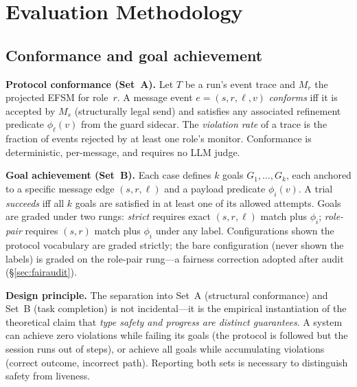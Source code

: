 % 
%

\section{Evaluation Methodology}\label{sec:method}

\subsection{Conformance and goal achievement}\label{sec:conform}

\textbf{Protocol conformance (Set~A).}
Let $T$ be a run's event trace and $M_r$ the projected EFSM for role~$r$.
A message event $e = (s, r, \ell, v)$ \emph{conforms} iff it is accepted by
$M_s$ (structurally legal send) and satisfies any associated refinement
predicate $\phi_\ell(v)$ from the guard sidecar.
The \emph{violation rate} of a trace is the fraction of events rejected by
at least one role's monitor.
Conformance is deterministic, per-message, and requires no LLM judge.

\textbf{Goal achievement (Set~B).}
Each case defines $k$ goals $G_1, \ldots, G_k$, each anchored to a specific
message edge $(s, r, \ell)$ and a payload predicate $\phi_i(v)$.
A trial \emph{succeeds} iff all $k$ goals are satisfied in at least one
of its allowed attempts.
Goals are graded under two rungs:
\emph{strict} requires exact $(s, r, \ell)$ match plus $\phi_i$;
\emph{role-pair} requires $(s, r)$ match plus $\phi_i$ under any label.
Configurations shown the protocol vocabulary are graded strictly;
the bare configuration (never shown the labels) is graded on the
role-pair rung---a fairness correction adopted after audit
(\S\ref{sec:fairaudit}).

\textbf{Design principle.}
The separation into Set~A (structural conformance) and Set~B (task
completion) is not incidental---it is the empirical instantiation of
the theoretical claim that \emph{type safety and progress are distinct
guarantees}.
A system can achieve zero violations while failing its goals (the
protocol is followed but the session runs out of steps), or achieve
all goals while accumulating violations (correct outcome, incorrect
path).
Reporting both sets is necessary to distinguish safety from liveness.

